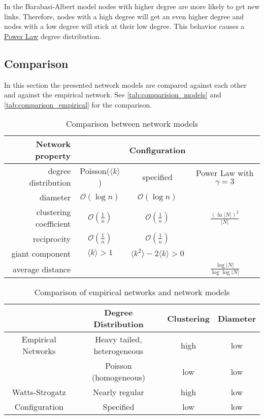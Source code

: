 \documentclass[english]{panikzettel}
\begin{document}
In the Barabasi-Albert model nodes with higher degree are more likely to get new links.
Therefore, nodes with a high degree will get an even higher degree and nodes with a low degree will stick at their low degree.
This behavior causes a \hyperref[sec:power_law]{Power Law} degree distribution.

\subsection{Comparison}
In this section the presented network models are compared against each other and against the empirical network. See \autoref{tab:comparision_models} and \autoref{tab:comparison_empirical} for the comparison.

\begin{table}[ht!]
	\centering
	\begin{tabular}{|r||c|c|c|}
		\hline
		Network property & \erdosrenyi & Configuration & \barabasi \\
		\hline
		degree distribution & Poisson($ \langle k \rangle $) & specified & Power Law with $ \gamma = 3 $ \\
		diameter & $ \mathcal{O}(\log n) $ & $ \mathcal{O}(\log n) $ & \\
		clustering coefficient & $\mathcal{O}(\frac{1}{n}) $ & $\mathcal{O}(\frac{1}{n}) $ & $\frac{(\ln |N|)^2}{|N|}$ \\
		reciprocity & $ \mathcal{O}(\frac{1}{n}) $ & $ \mathcal{O}(\frac{1}{n}) $ & \\
		giant component & $ \langle k \rangle > 1 $ & $ \langle k^2 \rangle - 2 \langle k \rangle > 0 $ & \\
		average distance & & & $ \frac{\log |N|}{\log \log |N|} $ \\
		\hline
	\end{tabular}
	\caption{Comparison between network models}
	\label{tab:comparision_models}
\end{table}

\begin{table}[ht!]
	\centering
	\begin{tabular}{|c|c|c|c|}
		\hline
		& Degree Distribution & Clustering & Diameter \\
		\hline
		Empirical Networks & Heavy tailed, heterogeneous & high & low \\
		\hline
		\erdosrenyi & Poisson (homogeneous) & low & low \\
		\hline
		Watts-Strogatz & Nearly regular & high & low \\
		\hline
		Configuration & Specified & low & low \\
		\hline
	\end{tabular}
	\caption{Comparison of empirical networks and network models}
	\label{tab:comparison_empirical}
\end{table}
\end{document}
